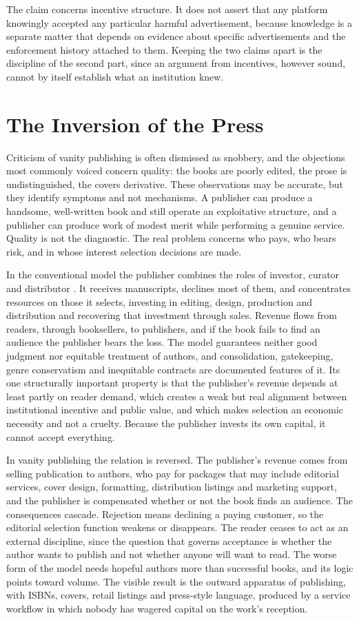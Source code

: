 \documentclass[12pt, a4paper]{article}
\begin{document}
The claim concerns incentive structure. It does not assert that any platform knowingly accepted any particular harmful advertisement, because knowledge is a separate matter that depends on evidence about specific advertisements and the enforcement history attached to them. Keeping the two claims apart is the discipline of the second part, since an argument from incentives, however sound, cannot by itself establish what an institution knew.

\section{The Inversion of the Press}

Criticism of vanity publishing is often dismissed as snobbery, and the objections most commonly voiced concern quality: the books are poorly edited, the prose is undistinguished, the covers derivative. These observations may be accurate, but they identify symptoms and not mechanisms. A publisher can produce a handsome, well-written book and still operate an exploitative structure, and a publisher can produce work of modest merit while performing a genuine service. Quality is not the diagnostic. The real problem concerns who pays, who bears risk, and in whose interest selection decisions are made.

In the conventional model the publisher combines the roles of investor, curator and distributor \citep{thompson2012}. It receives manuscripts, declines most of them, and concentrates resources on those it selects, investing in editing, design, production and distribution and recovering that investment through sales. Revenue flows from readers, through booksellers, to publishers, and if the book fails to find an audience the publisher bears the loss. The model guarantees neither good judgment nor equitable treatment of authors, and consolidation, gatekeeping, genre conservatism and inequitable contracts are documented features of it. Its one structurally important property is that the publisher's revenue depends at least partly on reader demand, which creates a weak but real alignment between institutional incentive and public value, and which makes selection an economic necessity and not a cruelty. Because the publisher invests its own capital, it cannot accept everything.

In vanity publishing the relation is reversed. The publisher's revenue comes from selling publication to authors, who pay for packages that may include editorial services, cover design, formatting, distribution listings and marketing support, and the publisher is compensated whether or not the book finds an audience. The consequences cascade. Rejection means declining a paying customer, so the editorial selection function weakens or disappears. The reader ceases to act as an external discipline, since the question that governs acceptance is whether the author wants to publish and not whether anyone will want to read. The worse form of the model needs hopeful authors more than successful books, and its logic points toward volume. The visible result is the outward apparatus of publishing, with ISBNs, covers, retail listings and press-style language, produced by a service workflow in which nobody has wagered capital on the work's reception.
\end{document}
